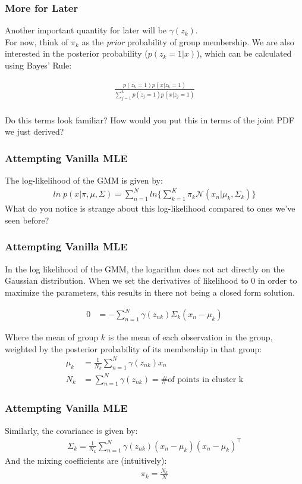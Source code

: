 \documentclass{beamer}
\begin{document}
\begin{frame}
\frametitle{More for Later}
Another important quantity for later will be $\gamma(z_k)$.\\
For now, think of $\pi_k$ as the \textit{prior} probability of group membership. We are also interested in the posterior probability ($p(z_k = 1|x) $), which can be calculated using Bayes' Rule:

\begin{align*}
  \frac{p(z_k = 1) p(x|z_k =1 )}{\sum_{j = 1}^{k} p(z_j = 1) p(x|z_j=1)}\\
\end{align*}

Do this terms look familiar? How would you put this in terms of the joint PDF we just derived?
\end{frame}

\begin{frame}
	\frametitle{Attempting Vanilla MLE}
	The log-likelihood of the GMM is given by:
	\begin{align*}
	ln\; p(x|\pi, \mu, \Sigma) = \sum_{n=1}^{N} ln\bigg\{\sum_{k=1}^{K}\pi_k \mathcal{N}(x_n | \mu_k, \Sigma_k) \bigg\}
	\end{align*}
	What do you notice is strange about this log-likelihood compared to ones we've seen before?
\end{frame}

\begin{frame}
\frametitle{Attempting Vanilla MLE}
	In the log likelihood of the GMM, the logarithm does not act directly on the Gaussian distribution. When we set the derivatives of likelihood to $0$ in order to maximize the parameters, this results in there not being a closed form solution.
	
	\begin{align*}
	 0&= -\sum_{n=1}^{N} \gamma(z_{nk}) \Sigma_k(x_n - \mu_k)
	\end{align*}
	
	Where the mean of group $k$ is the mean of each observation in the group, weighted by the posterior probability of its membership in that group:
	\begin{align*}
		 \mu_k &= \frac{1}{N_k} \sum_{n=1}^{N} \gamma(z_{nk})x_n \\
		 N_k &= \sum_{n=1}^{N} \gamma({z_{nk}}) = \text{\# of points in cluster k}
	\end{align*}
	
\end{frame}

\begin{frame}
\frametitle{Attempting Vanilla MLE}	
	Similarly, the covariance is given by:
	\begin{align*}
	\Sigma_k = \frac{1}{N_k} \sum_{n=1}^{N} \gamma(z_{nk})(x_n - \mu_k)(x_n - \mu_k)^\intercal
	\end{align*}
	And the mixing coefficients are (intuitively):
	\begin{align*}
	\pi_k = \frac{N_k}{N}
	\end{align*}
\end{frame}
\end{document}

